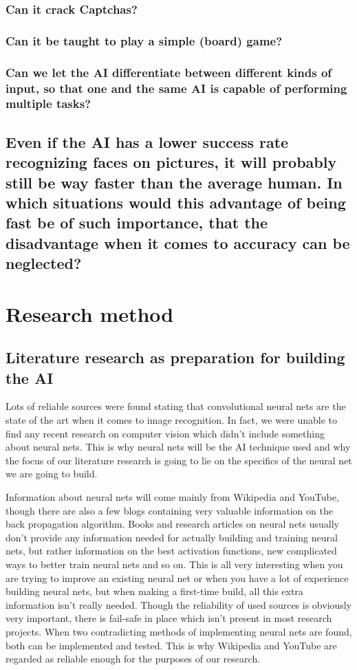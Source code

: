 \documentclass[12pt, titlepage]{article}
\let\oldsection\section
\renewcommand\section{\clearpage\oldsection}
\begin{document}
    \subsubsection{Can it crack Captchas?}
    \subsubsection{Can it be taught to play a simple (board) game?}
    \subsubsection{Can we let the AI differentiate between different kinds of input, so that one and the same AI is capable of performing multiple tasks?}
    
    
    \subsection{Even if the AI has a lower success rate recognizing faces on pictures, it will probably still be way faster than the average human. In which situations would this advantage of being fast be of such importance, that the disadvantage when it comes to accuracy can be neglected?}
    
    \section{Research method}
    \subsection{Literature research as preparation for building the AI}
    Lots of reliable sources were found stating that convolutional neural nets are the state of the art when it comes to image recognition\cite{gu}\cite{imageRecognition17}. In fact, we were unable to find any recent research on computer vision which didn’t include something about neural nets. This is why neural nets will be the AI technique used and why the focus of our literature research is going to lie on the specifics of the neural net we are going to build.
    
    \bigskip
    Information about neural nets will come mainly from Wikipedia and YouTube, though there are also a few blogs containing very valuable information on the back propagation algorithm. Books and research articles on neural nets usually don’t provide any information needed for actually building and training neural nets, but rather information on the best activation functions, new complicated ways to better train neural nets and so on.  This is all very interesting when you are trying to improve an existing neural net or when you have a lot of experience building neural nets, but when making a first-time build, all this extra information isn't really needed.
    \bigskip
    Though the reliability of used sources is obviously very important, there is fail-safe in place which isn’t present in most research projects. When two contradicting methods of implementing neural nets are found, both can be implemented and tested. This is why Wikipedia and YouTube are regarded as reliable enough for the purposes of our research.
    
\end{document}
